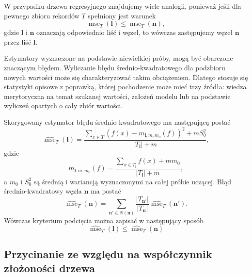 \documentclass[
]{book}
\theoremstyle{plain}
\theoremstyle{definition}
\theoremstyle{definition}
\theoremstyle{definition}
\theoremstyle{definition}
\theoremstyle{definition}
\theoremstyle{remark}
\begin{document}
W przypadku drzewa regresyjnego znajdujemy wiele analogii, ponieważ jeśli dla pewnego zbioru rekordów \(T\) spełniony jest warunek
\begin{equation}\label{kryterium1}
    \operatorname{mse}_T(\mathbf{l})\leq\operatorname{mse}_T(\mathbf{n}),
\end{equation}
gdzie \(\mathbf{l}\) i \(\mathbf{n}\) oznaczają odpowiednio liść i węzeł, to wówczas zastępujemy węzeł \(\mathbf{n}\) przez liść \(\mathbf{l}\).

Estymatory wyznaczone na podstawie niewielkiej próby, mogą być obarczone znaczącym błędem. Wyliczanie błędu średnio-kwadratowego dla podzbioru nowych wartości może się charakteryzować takim obciążeniem. Dlatego stosuje się statystyki opisowe z poprawką, której pochodzenie może mieć trzy źródła: wiedza merytoryczna na temat szukanej wartości, założeń modelu lub na podstawie wyliczeń opartych o cały zbiór wartości.

Skorygowany estymator błędu średnio-kwadratowego ma następującą postać
\begin{equation}\label{mse}
        \widehat{\operatorname{mse}}_T(\mathbf{l})=\frac{\sum_{x\in T}(f(x)-m_{\mathbf{l},m,m_0}(f))^2+mS_0^2}{|T_\mathbf{l}|+m},
\end{equation}
gdzie
\begin{equation}\label{poprawka}
        m_{\mathbf{l},m,m_0}(f)=\frac{\sum_{x\in T_\mathbf{l}}f(x)+mm_0}{|T_\mathbf{l}|+m},
\end{equation}
a \(m_0\) i \(S_0^2\) są średnią i wariancją wyznaczonymi na całej próbie uczącej.
Błąd średnio-kwadratowy węzła \(\mathbf{n}\) ma postać
\begin{equation}\label{propagacja}
        \widehat{\operatorname{mse}}_T(\mathbf{n})=\sum_{\mathbf{n}'\in N(\mathbf{n})}\frac{|T_{\mathbf{n}'}|}{|T_\mathbf{n}|}\widehat{\operatorname{mse}}_T(\mathbf{n}').
\end{equation}
Wówczas kryterium podcięcia można zapisać w następujący sposób
\begin{equation}\label{kryterium2}
        \widehat{\operatorname{mse}}_T(\mathbf{l}) \leq \widehat{\operatorname{mse}}_T(\mathbf{n})
\end{equation}

\subsection{Przycinanie ze względu na współczynnik złożoności drzewa}\label{przycinanie-ze-wzglux119du-na-wspuxf3ux142czynnik-zux142oux17conoux15bci-drzewa}
\end{document}
